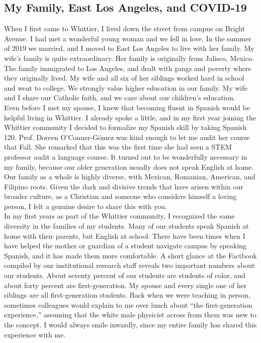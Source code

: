 \documentclass[../../main.tex]{subfiles}
\begin{document}
\subsection{My Family, East Los Angeles, and COVID-19}
\label{sec:family}

When I first came to Whittier, I lived down the street from campus on Bright Avenue.  I had met a wonderful young woman and we fell in love.  In the summer of 2019 we married, and I moved to East Los Angeles to live with her family.  My wife's family is quite extraordinary.  Her family is originally from Jalisco, Mexico.  The family immigrated to Los Angeles, and dealt with gangs and poverty where they originally lived.  My wife and all six of her siblings worked hard in school and went to college.  We strongly value higher education in our family.  My wife and I share our Catholic faith, and we care about our children's education.
\\
\vspace{0.25cm}
Even before I met my spouse, I knew that becoming fluent in Spanish would be helpful living in Whittier.  I already spoke a little, and in my first year joining the Whittier community I decided to formalize my Spanish skill by taking Spanish 120. Prof. Doreen O'Conner-G\'{o}mez was kind enough to let me audit her course that Fall.  She remarked that this was the first time she had seen a STEM professor audit a language course.  It turned out to be wonderfully necessary in my family, because our older generation usually does not speak English at home.  Our family as a whole is highly diverse, with Mexican, Romanian, American, and Filipino roots.  Given the dark and divisive trends that have arisen within our broader culture, as a Christian and someone who considers himself a loving person, I felt a genuine desire to share this with you.
\\
\vspace{0.25cm}
In my first years as part of the Whittier community, I recognized the same diversity in the families of my students.  Many of our students speak Spanish at home with their parents, but English at school.  There have been times when I have helped the mother or guardian of a student navigate campus by speaking Spanish, and it has made them more comfortable.  A short glance at the Factbook compiled by our institutional research staff reveals two important numbers about our students.  About seventy percent of our students are students of color, and about forty percent are first-generation.  My spouse and every single one of her siblings are all first-generation students.  Back when we were teaching in person, sometimes colleagues would explain to me over lunch about ``the first-generation experience,'' assuming that the white male physicist across from them was new to the concept.  I would always smile inwardly, since my entire family has shared this experience with me.
\end{document}

